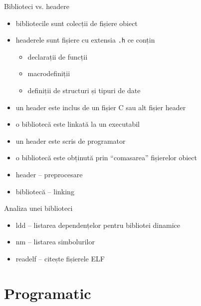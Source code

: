 \documentclass{beamer}
\begin{document}
\begin{frame}{Biblioteci vs. headere}
  \begin{itemize}
    \item bibliotecile sunt colecții de fișiere obiect
    \item headerele sunt fișiere cu extensia \texttt{.h} ce conțin
      \begin{itemize}
        \item declarații de funcții
        \item macrodefiniții
        \item definiții de structuri și tipuri de date
      \end{itemize}
    \item un header este inclus de un fișier C sau alt fișier header
    \item o bibliotecă este linkată la un executabil
    \item un header este scris de programator
    \item o bibliotecă este obținută prin ``comasarea'' fișierelor obiect
    \item header -- preprocesare
    \item bibliotecă -- linking
  \end{itemize}
\end{frame}

\begin{frame}{Analiza unei biblioteci}
  \begin{itemize}
    \item ldd -- listarea dependențelor pentru bibliotei dinamice
    \item nm -- listarea simbolurilor
    \item readelf -- citește fișierele ELF
  \end{itemize}
\end{frame}

\section{Programatic}
\end{document}
